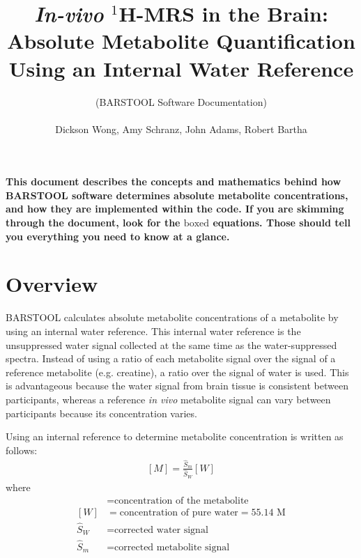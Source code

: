 \documentclass{article}
\begin{document}
\title{\textbf{\textit{In-vivo} $^1$H-MRS in the Brain:} \\ Absolute Metabolite Quantification Using an Internal Water Reference}
\author{(BARSTOOL Software Documentation) \\ \\ Dickson Wong, Amy Schranz, John Adams, Robert Bartha}

\maketitle

\bigskip
\textbf{This document describes the concepts and mathematics behind how BARSTOOL software determines absolute metabolite concentrations, and how they are implemented within the code. If you are skimming through the document, look for the $\boxed{\text{boxed}}$ equations. Those should tell you everything you need to know at a glance.}
\bigskip

\tableofcontents

\newpage
\section{Overview}
BARSTOOL calculates absolute metabolite concentrations of a metabolite by using an internal water reference. This internal water reference is the unsuppressed water signal collected at the same time as the water-suppressed spectra. Instead of using a ratio of each metabolite signal over the signal of a reference metabolite (e.g. creatine), a ratio over the signal of water is used. This is advantageous because the water signal from brain tissue is consistent between participants, whereas a reference \textit{in vivo} metabolite signal can vary between participants because its concentration varies. 

Using an internal reference to determine metabolite concentration is written as follows:
\begin{align}
	\boxed{[M] = \frac{\hat{S}_m}{\hat{S}_W}[W]}
	\label{eq:basic_eq}
\end{align}
where
\begin{align*}
	[M] &= \text{concentration of the metabolite} \\
	[W] &= \text{concentration of pure water} = 55.14 \text{ M} \\
	\hat{S}_W &= \text{corrected water signal} \\
	\hat{S}_m &= \text{corrected metabolite signal}
\end{align*}
\end{document}
